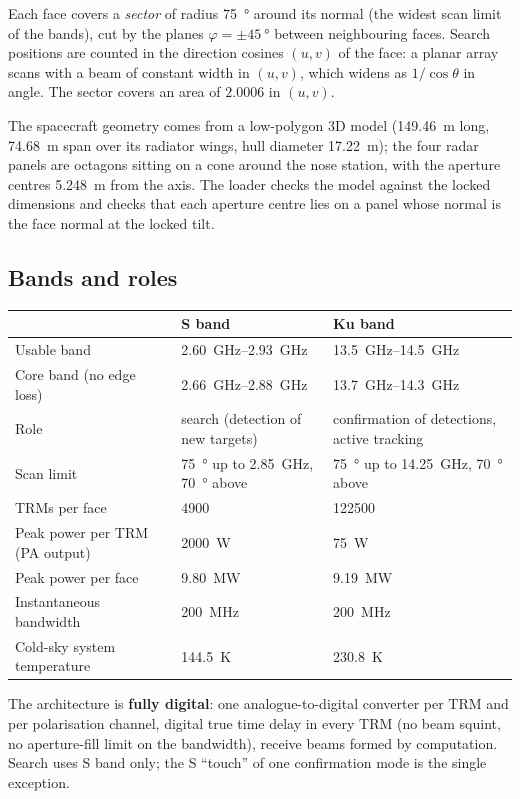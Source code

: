 \documentclass[11pt,a4paper]{article}
\begin{document}
Each face covers a \emph{sector} of radius \SI{75}{\degree} around its normal (the widest scan limit of the bands),
cut by the planes $\varphi = \pm\SI{45}{\degree}$ between neighbouring faces. Search positions are counted in the
direction cosines $(u, v)$ of the face: a planar array scans with a beam of constant width in $(u,v)$, which widens as
$1/\cos\theta$ in angle. The sector covers an area of $2.0006$ in $(u,v)$.

The spacecraft geometry comes from a low-polygon 3D model (\SI{149.46}{m} long, \SI{74.68}{m} span over its radiator
wings, hull diameter \SI{17.22}{m}); the four radar panels are octagons sitting on a cone around the nose station, with
the aperture centres \SI{5.248}{m} from the axis. The loader checks the model against the locked dimensions and checks
that each aperture centre lies on a panel whose normal is the face normal at the locked tilt.

\subsection{Bands and roles}
\begin{center}
\begin{tabularx}{\linewidth}{@{}lLL@{}}
\toprule
 & \textbf{S band} & \textbf{Ku band}\\
\midrule
Usable band & \SIrange{2.60}{2.93}{GHz} & \SIrange{13.5}{14.5}{GHz}\\
Core band (no edge loss) & \SIrange{2.66}{2.88}{GHz} & \SIrange{13.7}{14.3}{GHz}\\
Role & search (detection of new targets) & confirmation of detections, active tracking\\
Scan limit & \SI{75}{\degree} up to \SI{2.85}{GHz}, \SI{70}{\degree} above & \SI{75}{\degree} up to \SI{14.25}{GHz}, \SI{70}{\degree} above\\
TRMs per face & \num{4900} & \num{122500}\\
Peak power per TRM (PA output) & \SI{2000}{W} & \SI{75}{W}\\
Peak power per face & \SI{9.80}{MW} & \SI{9.19}{MW}\\
Instantaneous bandwidth & \SI{200}{MHz} & \SI{200}{MHz}\\
Cold-sky system temperature & \SI{144.5}{K} & \SI{230.8}{K}\\
\bottomrule
\end{tabularx}
\end{center}

The architecture is \textbf{fully digital}: one analogue-to-digital converter per TRM and per polarisation channel,
digital true time delay in every TRM (no beam squint, no aperture-fill limit on the bandwidth), receive beams formed
by computation. Search uses S band only; the S ``touch'' of one confirmation mode is the single exception.
\end{document}
